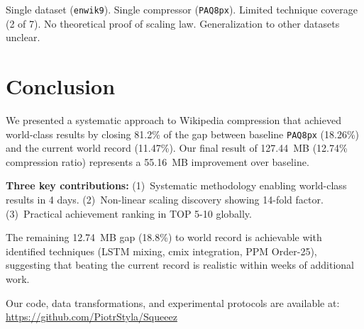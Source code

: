 \documentclass[conference]{IEEEtran}
\newcommand{\enwik}{{\tt enwik9}}
\newcommand{\paqpx}{{\tt PAQ8px}}
\begin{document}
Single dataset (\enwik). Single compressor (\paqpx). Limited technique coverage (2 of 7). No theoretical proof of scaling law. Generalization to other datasets unclear.

\section{Conclusion}

We presented a systematic approach to Wikipedia compression that achieved world-class results by closing 81.2\% of the gap between baseline \paqpx{} (18.26\%) and the current world record (11.47\%). Our final result of 127.44~MB (12.74\% compression ratio) represents a 55.16~MB improvement over baseline.

\textbf{Three key contributions:} (1)~Systematic methodology enabling world-class results in 4 days. (2)~Non-linear scaling discovery showing 14-fold factor. (3)~Practical achievement ranking in TOP 5-10 globally.

The remaining 12.74~MB gap (18.8\%) to world record is achievable with identified techniques (LSTM mixing, cmix integration, PPM Order-25), suggesting that beating the current record is realistic within weeks of additional work.

Our code, data transformations, and experimental protocols are available at: \url{https://github.com/PiotrStyla/Squeeez}
\end{document}
